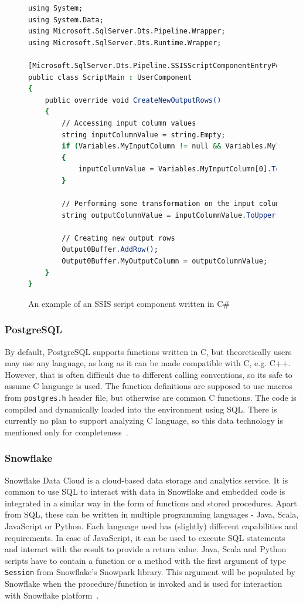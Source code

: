 \begin{figure}[ht]
\begin{lstlisting}[language=csh]
using System;
using System.Data;
using Microsoft.SqlServer.Dts.Pipeline.Wrapper;
using Microsoft.SqlServer.Dts.Runtime.Wrapper;

[Microsoft.SqlServer.Dts.Pipeline.SSISScriptComponentEntryPointAttribute]
public class ScriptMain : UserComponent
{
    public override void CreateNewOutputRows()
    {
        // Accessing input column values
        string inputColumnValue = string.Empty;
        if (Variables.MyInputColumn != null && Variables.MyInputColumn.Length > 0)
        {
            inputColumnValue = Variables.MyInputColumn[0].ToString();
        }

        // Performing some transformation on the input column value
        string outputColumnValue = inputColumnValue.ToUpper();

        // Creating new output rows
        Output0Buffer.AddRow();
        Output0Buffer.MyOutputColumn = outputColumnValue;
    }
}
\end{lstlisting}
\caption{An example of an SSIS script component written in C\#}
\label{fig:cSharpScript}
\end{figure}

\subsubsection{PostgreSQL}
By default, PostgreSQL supports functions written in C, but theoretically users may use any language, as long as it can be made compatible with C, e.g. C++. However, that is often difficult due to different calling conventions, so its safe to assume C language is used. The function definitions are supposed to use macros from \texttt{postgres.h} header file, but otherwise are common C functions. The code is compiled and dynamically loaded into the environment using SQL. There is currently no plan to support analyzing C language, so this data technology is mentioned only for completeness~\cite{postgresql}.

\subsubsection{Snowflake}
Snowflake Data Cloud is a cloud-based data storage and analytics service. It is common to use SQL to interact with data in Snowflake and embedded code is integrated in a similar way in the form of functions and stored procedures. Apart from SQL, these can be written in multiple programming languages - Java, Scala, JavaScript or Python. Each language used has (slightly) different capabilities and requirements. In case of JavaScript, it can be used to execute SQL statements and interact with the result to provide a return value. Java, Scala and Python scripts have to contain a function or a method with the first argument of type \texttt{Session} from Snowflake's Snowpark library. This argument will be populated by Snowflake when the procedure/function is invoked and is used for interaction with Snowflake platform~\cite{snowflake}.

